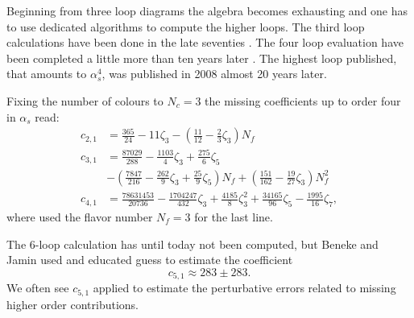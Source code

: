 \documentclass[../../index.tex]{subfiles}
\begin{document}
Beginning from three loop diagrams the algebra becomes exhausting and one has to
use dedicated algorithms to compute the higher loops. The third loop
calculations have been done in the late seventies
\cite{Chetyrkin1979,Dine1979,Celmaster1979}. The four loop evaluation have been
completed a little more than ten years later
\cite{Gorishnii1990,Surguladze1990}. The highest loop published, that amounts to
\(\alpha_s^4\), was published in 2008 \cite{Baikov2008} almost 20 years later.

Fixing the number of colours to \(N_c=3\) the missing coefficients up to order
four in \(\alpha_s\) read:
\begin{equation}
  \label{eq:adlerCoefficients}
  \begin{split}
    c_{2,1} &= \frac{365}{24} - 11 \zeta_3 - \left( \frac{11}{12} - \frac{2}{3}\zeta_3 \right) N_f \\
    c_{3,1} &= \frac{87029}{288} - \frac{1103}{4} \zeta_3 + \frac{275}{6}\zeta_5 \\
    &- \left( \frac{7847}{216} - \frac{262}{9} \zeta_3 + \frac{25}{9} \zeta_5 \right) N_f + \left( \frac{151}{162} - \frac{19}{27}\zeta_3\right)N_f^2 \\
    c_{4,1} &= \frac{78631453}{20736} - \frac{1704247}{432}\zeta_3 +
    \frac{4185}{8}\zeta_3^2 + \frac{34165}{96}\zeta_5 - \frac{1995}{16}\zeta_7,
  \end{split}
\end{equation}
where used the flavor number \(N_f=3\) for the last line.

The 6-loop calculation has until today not been computed, but Beneke and Jamin
\cite{Beneke2008} used and educated guess to estimate the coefficient
\begin{equation}
  c_{5,1} \approx 283 \pm 283.
\end{equation}
We often see \(c_{5,1}\) applied to estimate the perturbative errors related to
missing higher order contributions.
\end{document}
